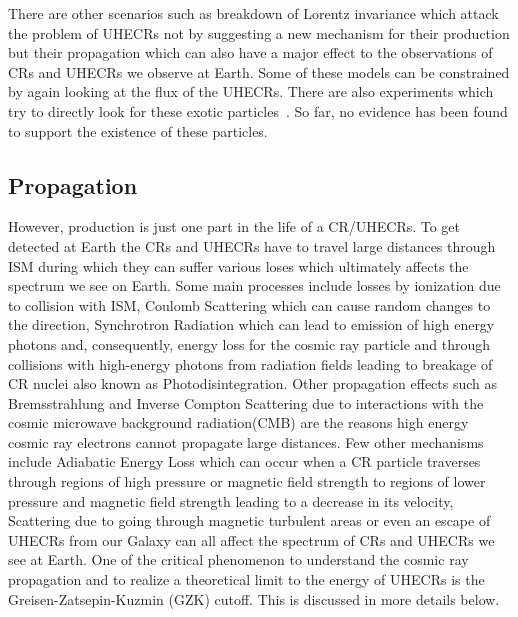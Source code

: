 There are other scenarios such as breakdown of Lorentz invariance which attack the problem of UHECRs not by suggesting a new mechanism for their production but their propagation which can also have a major effect to the observations of CRs and UHECRs we observe at Earth. Some of these models can be constrained by again looking at the flux of the UHECRs. There are also experiments which try to directly look for these exotic particles~\cite{}. So far, no evidence has been found to support the existence of these particles. 

\subsection{Propagation}
\label{subsec:crprop}
However, production is just one part in the life of a CR/UHECRs. To get detected at Earth the CRs and UHECRs have to travel large distances through ISM during which they can suffer various loses which ultimately affects the spectrum we see on Earth. Some main processes include losses by ionization due to collision with ISM, Coulomb Scattering which can cause random changes to the direction, Synchrotron Radiation which can lead to emission of high energy photons and, consequently, energy loss for the cosmic ray particle and through collisions with high-energy photons from radiation fields leading to breakage of CR nuclei also known as Photodisintegration. Other propagation effects such as Bremsstrahlung and Inverse Compton Scattering due to interactions with the cosmic microwave background radiation(CMB)  are the reasons high energy cosmic ray electrons cannot propagate large distances. Few other mechanisms include Adiabatic Energy Loss which can occur when a CR particle traverses through regions of high pressure or magnetic field strength to regions of lower pressure and magnetic field strength leading to a decrease in its velocity, Scattering due to going through magnetic turbulent areas or even an escape of UHECRs from our Galaxy can all affect the spectrum of CRs and UHECRs we see at Earth. One of the critical phenomenon to understand the cosmic ray propagation and to realize a theoretical limit to the energy of UHECRs is the Greisen-Zatsepin-Kuzmin (GZK) cutoff. This is discussed in more details below.

